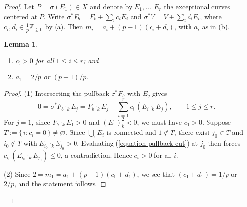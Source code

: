 \documentclass[reqno,oneside]{amsart}
\newtheorem{lemma}[theorem]{Lemma}
\theoremstyle{definition}
\theoremstyle{plain}
\numberwithin{equation}{section}
\begin{document}
\begin{proof}
\smallskip
Let $P = \sigma(E_1) \in X$ and denote by $E_1, \dots, E_r$ the exceptional curves centered at $P$.
Write $\sigma^*\overline F_b = F_b + \sum_{i} c_i E_i$ and $\sigma^*\overline V = V + \sum_i d_i E_i$, where $c_i, d_i \in \frac1p\mathbb{Z}_{\geq 0}$ by (a).
Then $m_i = a_i + (p-1) (c_i + d_i)$, with $a_i$ as in (b).

\begin{lemma}\label{lemma-ci-positive}%
  \begin{enumerate}[\rm(1)]
    \item $c_i>0$ for all $1\le i\le r$; and
    \item $a_1 = 2/p$ or $(p+1)/p$.
  \end{enumerate}
\end{lemma}
\begin{proof}
  (1) 
  Intersecting the pullback $\sigma^*\overline F_b$ with $E_j$ gives
  \begin{equation}\label{equation-pullback-cut}
    0 = \sigma^*\overline F_b \cdot_k E_j = F_b \cdot_k E_j + \sum_{i=1}^r c_i\,(E_i\cdot_k E_j),
    \qquad 1\le j\le r.
  \end{equation}
  For $j=1$, since $F_b \cdot_k E_1 > 0$ and $(E_1)^2_k<0$, we must have $c_1 > 0$.
  Suppose $T:=\{\,i:c_i=0\,\}\neq\varnothing$. Since $\bigcup_i E_i$ is connected and $1\notin T$, there exist $j_0\in T$ and $i_0\notin T$ with $E_{i_0}\cdot_k E_{j_0}>0$.
  Evaluating (\ref{equation-pullback-cut}) at $j_0$ then forces $c_{i_0}(E_{i_0}\cdot_k E_{j_0})\le0$, a contradiction. Hence $c_i>0$ for all $i$.

  (2) Since $2 = m_1 = a_1 + (p-1)(c_1 + d_1)$, we see that $(c_1 + d_1) = 1/p$ or $2/p$, and the statement follows.
\end{proof}


\end{proof}
\end{document}
